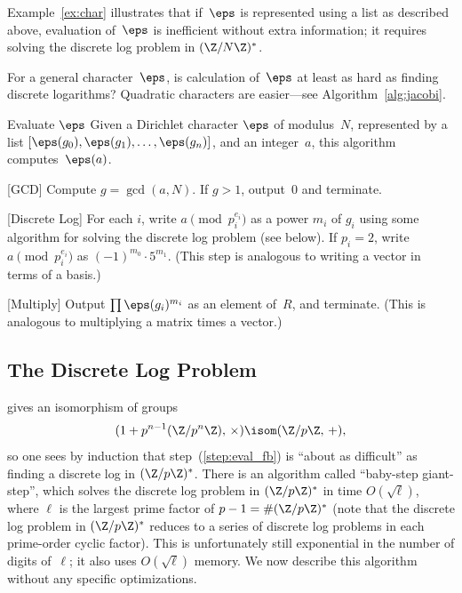 Example~\ref{ex:char} illustrates that if~$\eps$ is represented using
a list as described above, evaluation of~$\eps$ is inefficient without
extra information; it requires solving the discrete log problem in
$(\Z/N\Z)^*$. 

\begin{remark}
For a general character~$\eps$, is calculation
of~$\eps$ at least as hard as finding discrete
logarithms? Quadratic characters
are easier---see Algorithm~\ref{alg:jacobi}.
\end{remark}

\begin{algorithm}{Evaluate $\eps$}\label{alg:eval_eps}
Given a Dirichlet character $\eps$ of modulus~$N$, represented
by a list $[\eps(g_0), \eps(g_1), \ldots, \eps(g_n)]$,
and an integer~$a$, this algorithm computes~$\eps(a)$.
\begin{steps}
\item{}[GCD] Compute $g=\gcd(a,N)$.  If $g>1$, output~$0$ and terminate.
\item{}[Discrete Log]\label{step:eval_fb} For each $i$, write $a\pmod{p_i^{e_i}}$ as a
  power $m_i$ of $g_i$ using some algorithm for solving the discrete
  log problem (see below).  If $p_i=2$, write
  $a\pmod{p_i^{e_i}}$ as $(-1)^{m_0}\cdot 5^{m_1}$.  (This step is
  analogous to writing a vector in terms of a basis.)
\item{}[Multiply] Output $\prod \eps(g_i)^{m_i}$ as an
  element of~$R$, and terminate.  (This is analogous to multiplying a
  matrix times a vector.)
\end{steps}
\end{algorithm}

\subsection{The Discrete Log Problem}
 gives  an isomorphism
of groups
$$
(1+p^{n-1}(\Z/p^n\Z),\,\times) \isom (\Z/p\Z,\,+),
$$
so one sees by induction that step~(\ref{step:eval_fb}) is ``about as
difficult'' as finding a discrete log in $(\Z/p\Z)^*$.  There is an
algorithm called ``baby-step giant-step'', which solves the discrete
log problem in $(\Z/p\Z)^*$ in time $O(\sqrt{\ell})$, where $\ell$ is
the largest prime factor of $p-1=\#(\Z/p\Z)^*$ (note that the discrete
log problem in $(\Z/p\Z)^*$ reduces to a series of discrete log
problems in each prime-order cyclic factor).  This is unfortunately
still exponential in the number of digits of~$\ell$; it also uses
$O(\sqrt{\ell})$ memory.  We now describe this algorithm without
any specific optimizations.

